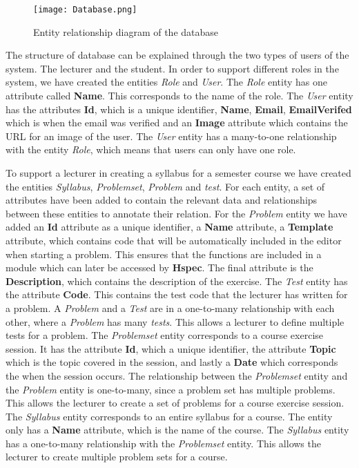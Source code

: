 \begin{figure}[H]
	\texttt{[image: Database.png]}
	\centering
	\caption{Entity relationship diagram of the database}
	\label{fig:Database}
\end{figure}

The structure of database can be explained through the two types of users of the system. The lecturer and the student. 
In order to support different roles in the system, we have created the entities \textit{Role} and \textit{User}. The \textit{Role} entity has one attribute called \textbf{Name}. This corresponds to the name of the role. The \textit{User} entity has the attributes \textbf{Id}, which is a unique identifier, \textbf{Name}, \textbf{Email}, \textbf{EmailVerifed} which is when the email was verified and an \textbf{Image} attribute which contains the URL for an image of the user. The \textit{User} entity has a many-to-one relationship with the entity \textit{Role}, which means that users can only have one role. 

To support a lecturer in creating a syllabus for a semester course we have created the entities \textit{Syllabus}, \textit{Problemset}, \textit{Problem} and \textit{test}. For each entity, a set of attributes have been added to contain the relevant data and relationships between these entities to annotate their relation.
For the \textit{Problem} entity we have added an \textbf{Id} attribute as a unique identifier, a \textbf{Name} attribute, a \textbf{Template} attribute, which contains code that will be automatically included in the editor when starting a problem. This ensures that the functions are included in a module which can later be accessed by \textbf{Hspec}. The final attribute is the \textbf{Description}, which contains the description of the exercise.
The \textit{Test} entity has the attribute \textbf{Code}. This contains the test code that the lecturer has written for a problem. A \textit{Problem} and a \textit{Test} are in a one-to-many relationship with each other, where a \textit{Problem} has many \textit{tests}. This allows a lecturer to define multiple tests for a problem.
The \textit{Problemset} entity corresponds to a course exercise session. It has the attribute \textbf{Id}, which a unique identifier, the attribute \textbf{Topic} which is the topic covered in the session, and lastly a \textbf{Date} which corresponds the when the session occurs. The relationship between the \textit{Problemset} entity and the \textit{Problem} entity is one-to-many, since a problem set has multiple problems. This allows the lecturer to create a set of problems for a course exercise session.
The \textit{Syllabus} entity corresponds to an entire syllabus for a course. The entity only has a \textbf{Name} attribute, which is the name of the course. The \textit{Syllabus} entity has a one-to-many relationship with the \textit{Problemset} entity. This allows the lecturer to create multiple problem sets for a course.

